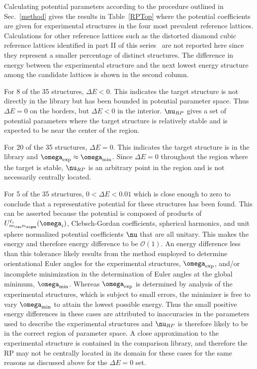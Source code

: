 \documentclass[preprint]{iucr}              %
\newcommand{\mb}[1]{\ensuremath{\mbox{\boldmath $ #1 $}}}
\begin{document}
Calculating potential parameters according to the procedure outlined
in Sec.~\ref{method} gives the results in Table~\ref{RPTop} where
the potential coefficients are given for experimental structures in
the four most prevalent reference lattices. Calculations for other
reference lattices such as the distorted diamond cubic reference lattices
identified in part II of this series~\cite{McClurg09} are not reported here
since
they represent a smaller percentage of distinct structures. The
difference in energy between the experimental structure and the next
lowest energy structure among the candidate lattices is shown in the
second column.

For 8 of the 35 structures, $\Delta E<0$. This indicates the target
structure is not directly in the library but has been bounded in potential
parameter space.  Thus $\Delta E=0$ on the borders,
but $\Delta E<0$ in the interior. $\mb{\nu}_{RP}$ gives a set of
potential parameters where the target structure is relatively stable
and is expected to be near the center of the region.


For 20 of the 35 structures, $\Delta E=0$.  This indicates the
target structure is in the library and
$\mb{\omega}_{\mathrm{exp}}\approx \mb{\omega}_{\mathrm{min}}$.
Since $\Delta E=0$ throughout the region where the target is stable,
$\mb{\nu}_{RP}$ is an arbitrary point in the region and is not
necessarily centrally located.


For 5 of the 35 structures, $0< \Delta E < 0.01$ which is close enough to zero
to conclude that a representative potential for these structures has been found.
This can be asserted because the potential is composed of products
of $U^{\ell_i}_{m_\tau n_\sigma}(\mb{\omega}_i)$, Clebsch-Gordan
coefficients, spherical harmonics, and unit sphere normalized
potential coefficients $\mb{\nu}$ that are all unitary.  This makes
the energy and therefore energy difference to be $\mathcal{O}(1)$.
An energy difference less than this tolerance likely results from the method
employed to determine orientational Euler angles for the experimental
structures, $\mb{\omega}_{\mathrm{exp}}$, and/or incomplete minimization in the
determination of Euler angles at the global minimum,
$\mb{\omega}_{\mathrm{min}}$.  Whereas $\mb{\omega}_{\mathrm{exp}}$ is
determined by analysis of the experimental structures, which is subject to small
errors, the minimizer is free to vary $\mb{\omega}_{\mathrm{min}}$ to attain the
lowest possible energy.  Thus the small positive energy differences in these
cases are attributed to inaccuracies in the parameters used to describe the
experimental structures and 
$\mb{\nu}_{RP}$ is therefore likely to be in the correct region of parameter
space.  A close approximation to the experimental structure is contained in the
comparison library, and therefore the RP may not be centrally located in its
domain for these cases for the same reasons as discussed above for the $\Delta E
= 0$ set. 
\end{document}
